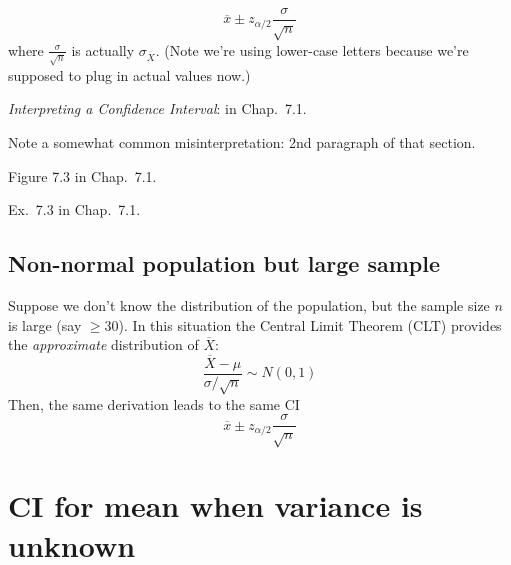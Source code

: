 \documentclass[12pt]{article}
\begin{document}
\[ \overline{x} \pm z_{\alpha/2} \frac{\sigma}{\sqrt{n}}
\]
where $\frac{\sigma}{\sqrt{n}}$ is actually
$\sigma_{\overline{X}}$.
(Note we're using lower-case letters because
we're supposed to plug in actual values now.)

\emph{Interpreting a Confidence Interval}: in Chap.~7.1.

Note a somewhat common misinterpretation:
2nd paragraph of that section.

Figure 7.3 in Chap.~7.1.


\example
Ex.~7.3 in Chap.~7.1.


% 
% 
% 



\subsection{Non-normal population but large sample}

Suppose we don't know the distribution of the population,
but the sample size $n$ is large (say $\ge 30$).
In this situation the Central Limit Theorem (CLT)
provides the \emph{approximate}
distribution of $\overline{X}$:
\[
\frac{\overline{X} - \mu}{\sigma/\sqrt{n}} \sim N(0,1)
\]
Then, the same derivation leads to the same CI
\[
\overline{x} \pm z_{\alpha/2} \frac{\sigma}{\sqrt{n}}
\]


\section{CI for mean when variance is unknown}
\end{document}
